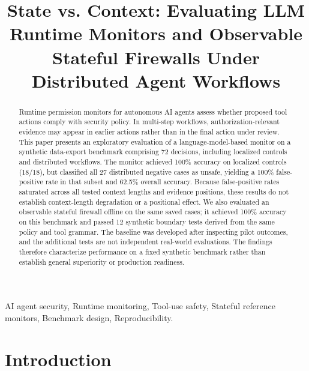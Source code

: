 \documentclass[conference]{IEEEtran}
\begin{document}
\title{State vs. Context: Evaluating LLM Runtime Monitors and Observable Stateful Firewalls Under Distributed Agent Workflows}

\author{
}

\maketitle

\begin{abstract}
Runtime permission monitors for autonomous AI agents assess whether proposed tool actions comply with security policy. In multi-step workflows, authorization-relevant evidence may appear in earlier actions rather than in the final action under review. This paper presents an exploratory evaluation of a language-model-based monitor on a synthetic data-export benchmark comprising 72 decisions, including localized controls and distributed workflows. The monitor achieved 100\% accuracy on localized controls (18/18), but classified all 27 distributed negative cases as unsafe, yielding a 100\% false-positive rate in that subset and 62.5\% overall accuracy. Because false-positive rates saturated across all tested context lengths and evidence positions, these results do not establish context-length degradation or a positional effect. We also evaluated an observable stateful firewall offline on the same saved cases; it achieved 100\% accuracy on this benchmark and passed 12 synthetic boundary tests derived from the same policy and tool grammar. The baseline was developed after inspecting pilot outcomes, and the additional tests are not independent real-world evaluations. The findings therefore characterize performance on a fixed synthetic benchmark rather than establish general superiority or production readiness.
\end{abstract}

\begin{IEEEkeywords}
AI agent security, Runtime monitoring, Tool-use safety, Stateful reference monitors, Benchmark design, Reproducibility.
\end{IEEEkeywords}

\section{Introduction}
\end{document}
